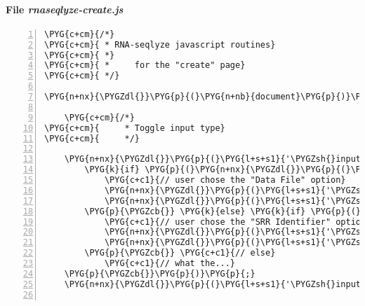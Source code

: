 \paragraph{File \emph{rnaseqlyze-create.js}}
\label{rnaseqlyze-pdf:file-rnaseqlyze-create-js}
\begin{Verbatim}[commandchars=\\\{\},numbers=left,firstnumber=1,stepnumber=5]
\PYG{c+cm}{/*}
\PYG{c+cm}{ * RNA-seqlyze javascript routines}
\PYG{c+cm}{ *}
\PYG{c+cm}{ *     for the "create" page}
\PYG{c+cm}{ */}

\PYG{n+nx}{\PYGZdl{}}\PYG{p}{(}\PYG{n+nb}{document}\PYG{p}{)}\PYG{p}{.}\PYG{n+nx}{ready}\PYG{p}{(}\PYG{k+kd}{function}\PYG{p}{(}\PYG{p}{)} \PYG{p}{\PYGZob{}}

    \PYG{c+cm}{/*}
\PYG{c+cm}{     * Toggle input type}
\PYG{c+cm}{     */}

    \PYG{n+nx}{\PYGZdl{}}\PYG{p}{(}\PYG{l+s+s1}{'\PYGZsh{}input\PYGZus{}type\PYGZus{}radio'}\PYG{p}{)}\PYG{p}{.}\PYG{n+nx}{click}\PYG{p}{(}\PYG{k+kd}{function}\PYG{p}{(}\PYG{n+nx}{event}\PYG{p}{)} \PYG{p}{\PYGZob{}}
        \PYG{k}{if} \PYG{p}{(}\PYG{n+nx}{\PYGZdl{}}\PYG{p}{(}\PYG{n+nx}{event}\PYG{p}{.}\PYG{n+nx}{target}\PYG{p}{)}\PYG{p}{.}\PYG{n+nx}{hasClass}\PYG{p}{(}\PYG{l+s+s2}{"srr"}\PYG{p}{)}\PYG{p}{)} \PYG{p}{\PYGZob{}}
            \PYG{c+c1}{// user chose the "Data File" option}
            \PYG{n+nx}{\PYGZdl{}}\PYG{p}{(}\PYG{l+s+s1}{'\PYGZsh{}sra-controls'}\PYG{p}{)}\PYG{p}{.}\PYG{n+nx}{hide}\PYG{p}{(}\PYG{p}{)}\PYG{p}{;}
            \PYG{n+nx}{\PYGZdl{}}\PYG{p}{(}\PYG{l+s+s1}{'\PYGZsh{}srr-controls'}\PYG{p}{)}\PYG{p}{.}\PYG{n+nx}{show}\PYG{p}{(}\PYG{p}{)}\PYG{p}{;}
        \PYG{p}{\PYGZcb{}} \PYG{k}{else} \PYG{k}{if} \PYG{p}{(}\PYG{n+nx}{\PYGZdl{}}\PYG{p}{(}\PYG{n+nx}{event}\PYG{p}{.}\PYG{n+nx}{target}\PYG{p}{)}\PYG{p}{.}\PYG{n+nx}{hasClass}\PYG{p}{(}\PYG{l+s+s2}{"sra"}\PYG{p}{)}\PYG{p}{)} \PYG{p}{\PYGZob{}}
            \PYG{c+c1}{// user chose the "SRR Identifier" option}
            \PYG{n+nx}{\PYGZdl{}}\PYG{p}{(}\PYG{l+s+s1}{'\PYGZsh{}srr-controls'}\PYG{p}{)}\PYG{p}{.}\PYG{n+nx}{hide}\PYG{p}{(}\PYG{p}{)}\PYG{p}{;}
            \PYG{n+nx}{\PYGZdl{}}\PYG{p}{(}\PYG{l+s+s1}{'\PYGZsh{}sra-controls'}\PYG{p}{)}\PYG{p}{.}\PYG{n+nx}{show}\PYG{p}{(}\PYG{p}{)}\PYG{p}{;}
        \PYG{p}{\PYGZcb{}} \PYG{c+c1}{// else}
            \PYG{c+c1}{// what the...}
    \PYG{p}{\PYGZcb{}}\PYG{p}{)}\PYG{p}{;}
    \PYG{n+nx}{\PYGZdl{}}\PYG{p}{(}\PYG{l+s+s1}{'\PYGZsh{}input\PYGZus{}type\PYGZus{}radio .srr'}\PYG{p}{)}\PYG{p}{.}\PYG{n+nx}{click}\PYG{p}{(}\PYG{p}{)}\PYG{p}{;}


\end{Verbatim}
